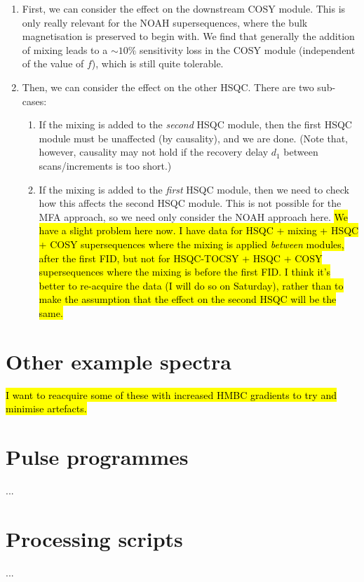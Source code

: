 \begin{enumerate}
    \item First, we can consider the effect on the downstream COSY module.
        This is only really relevant for the NOAH supersequences, where the bulk magnetisation is preserved to begin with.
        We find that generally the addition of mixing leads to a $\sim 10\%$ sensitivity loss in the COSY module (independent of the value of $f$), which is still quite tolerable.

    \item Then, we can consider the effect on the other HSQC.
        There are two sub-cases:

        \begin{enumerate}
            \item If the mixing is added to the \textit{second} HSQC module, then the first HSQC module must be unaffected (by causality), and we are done.
                (Note that, however, causality may not hold if the recovery delay $d_1$ between scans/increments is too short.)
            \item If the mixing is added to the \textit{first} HSQC module, then we need to check how this affects the second HSQC module.
                This is not possible for the MFA approach, so we need only consider the NOAH approach here.
                \hl{We have a slight problem here now. I have data for HSQC + mixing + HSQC + COSY supersequences where the mixing is applied \textit{between} modules, after the first FID, but not for HSQC-TOCSY + HSQC + COSY supersequences where the mixing is before the first FID. I think it's better to re-acquire the data (I will do so on Saturday), rather than to make the assumption that the effect on the second HSQC will be the same.}
        \end{enumerate}

\end{enumerate}

\section{Other example spectra}

\hl{I want to reacquire some of these with increased HMBC gradients to try and minimise artefacts.}

\section{Pulse programmes}

...

\section{Processing scripts}

...
